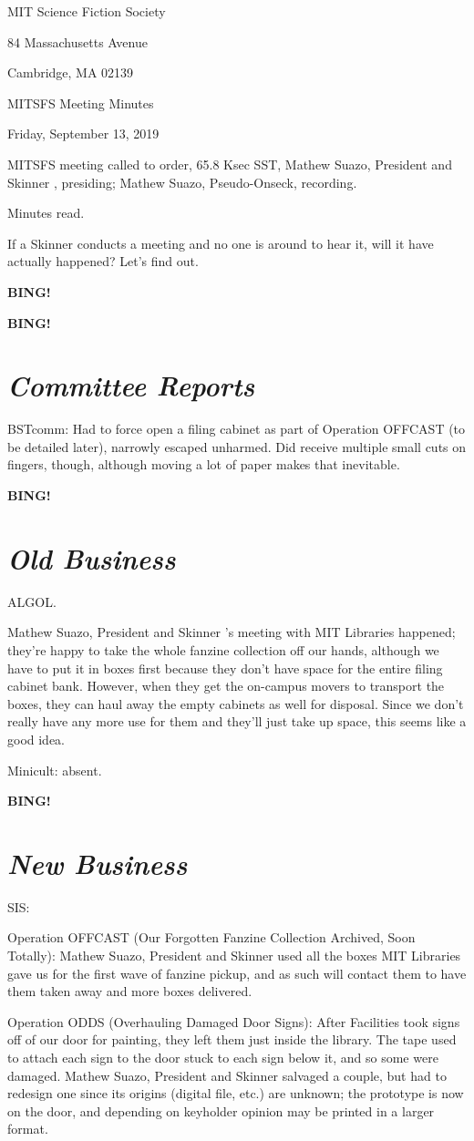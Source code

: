 \documentclass[10pt]{article}
\newcommand{\bing}{{\bf BING!} }
\newcommand{\goto}[1]{\bing \vskip 12pt \section*{{\em{#1}}}}
\newcommand{\skinner}{Mathew Suazo, President and Skinner }
\newcommand{\onseck}{Mathew Suazo, Pseudo-Onseck}
\newcommand{\meetingdate}{Friday, September 13, 2019 }
\begin{document}
\begin{center}

MIT Science Fiction Society

84 Massachusetts Avenue

Cambridge, MA 02139

\vspace{12pt}

MITSFS Meeting Minutes

\meetingdate

\end{center}

\vspace{18pt}

\setlength{\parskip}{6pt}

\noindent
MITSFS meeting called to order, 65.8 Ksec SST,
\skinner, presiding; \onseck, recording.

Minutes read.

If a Skinner conducts a meeting and no one is around to hear it, will it have actually happened? Let's find out.

\bing

\goto{Committee Reports}

BSTcomm: Had to force open a filing cabinet as part of Operation OFFCAST (to be detailed later), narrowly escaped unharmed. Did receive multiple small cuts on fingers, though, although moving a lot of paper makes that inevitable.

\goto{Old Business}

ALGOL.

\skinner 's meeting with MIT Libraries happened; they're happy to take the whole fanzine collection off our hands, although we have to put it in boxes first because they don't have space for the entire filing cabinet bank. However, when they get the on-campus movers to transport the boxes, they can haul away the empty cabinets as well for disposal. Since we don't really have any more use for them and they'll just take up space, this seems like a good idea.

Minicult: absent.

\goto{New Business}

SIS:

Operation OFFCAST (Our Forgotten Fanzine Collection Archived, Soon Totally): \skinner used all the boxes MIT Libraries gave us for the first wave of fanzine pickup, and as such will contact them to have them taken away and more boxes delivered.

Operation ODDS (Overhauling Damaged Door Signs): After Facilities took signs off of our door for painting, they left them just inside the library. The tape used to attach each sign to the door stuck to each sign below it, and so some were damaged. \skinner salvaged a couple, but had to redesign one since its origins (digital file, etc.) are unknown; the prototype is now on the door, and depending on keyholder opinion may be printed in a larger format.
\end{document}
